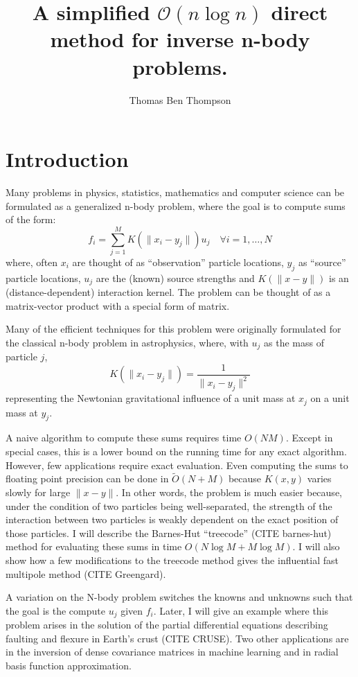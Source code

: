 \documentclass[10pt]{article}
\author{Thomas Ben Thompson}
\title{A simplified $\mathcal{O}(n\log{n})$ direct method for inverse n-body problems.}
\begin{document}
\maketitle

\section*{Introduction}
    Many problems in physics, statistics, mathematics and computer science can be formulated as a generalized n-body problem, where the goal is to compute sums of the form:
\begin{equation}
    f_i = \displaystyle \sum_{j = 1}^M K(\|x_i - y_j\|) u_j \quad \forall i = 1,\dots,N
\end{equation}
where, often $x_i$ are thought of as ``observation'' particle locations, $y_j$ as ``source'' particle locations, $u_j$ are the (known) source strengths and $K(\|x - y\|)$ is an (distance-dependent) interaction kernel. The problem can be thought of as a matrix-vector product with a special form of matrix.

Many of the efficient techniques for this problem were originally formulated for the classical n-body problem in astrophysics, where, with $u_j$ as the mass of particle $j$,
\begin{equation}
    K(\|x_i - y_j\|) = \frac{1}{\|x_i - y_j\|^2}
\end{equation}
representing the Newtonian gravitational influence of a unit mass at $x_j$ on a unit mass at $y_j$.

A naive algorithm to compute these sums requires time $O(NM)$. Except in special cases, this is a lower bound on the running time for any exact algorithm. However, few applications require exact evaluation. Even computing the sums to floating point precision can be done in $\widetilde{O}(N + M)$ because $K(x,y)$ varies slowly for large $\|x - y\|$. In other words, the problem is much easier because, under the condition of two particles being well-separated, the strength of the interaction between two particles is weakly dependent on the exact position of those particles. I will describe the Barnes-Hut ``treecode'' (CITE barnes-hut) method for evaluating these sums in time $O(N\log{M} + M\log{M})$. I will also show how a few modifications to the treecode method gives the influential fast multipole method (CITE Greengard). 

A variation on the N-body problem switches the knowns and unknowns such that the goal is the compute $u_j$ given $f_i$. Later, I will give an example where this problem arises in the solution of the partial differential equations describing faulting and flexure in Earth's crust (CITE CRUSE). Two other applications are in the inversion of dense covariance matrices in machine learning and in radial basis function approximation. 
\end{document}
